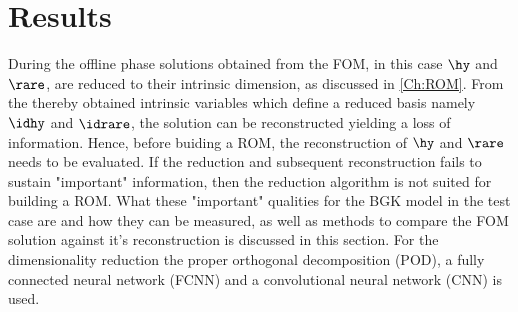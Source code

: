 
\chapter{Results}
\label{Ch:Results}

During the offline phase solutions obtained from the FOM, in this case $\hy$ and $\rare$, are reduced to their intrinsic dimension, as discussed in \cref{Ch:ROM}. From the thereby obtained intrinsic variables which define a reduced basis namely $\idhy$ and $\idrare$, the solution can be reconstructed yielding a loss of information. Hence, before buiding a ROM, the reconstruction of $\hy$ and $\rare$ needs to be evaluated. If the reduction and subsequent reconstruction fails to sustain "important" information, then the reduction algorithm is not suited for building a ROM. What these "important" qualities for the BGK model in the test case are and how they can be measured, as well as methods to compare the FOM solution against it's reconstruction is discussed in this section. For the dimensionality reduction the proper orthogonal decomposition (POD), a fully connected neural network (FCNN) and a convolutional neural network (CNN) is used.\\


